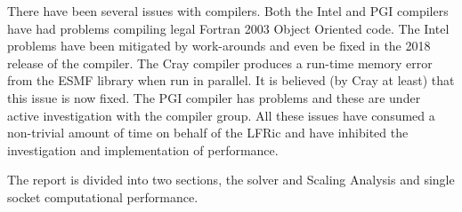 \documentclass[11pt]{article}
\begin{document}
There have been several issues with compilers. Both the Intel and PGI
compilers have had problems compiling legal Fortran 2003 Object
Oriented code. The Intel problems have been mitigated by work-arounds
and even be fixed in the 2018 release of the compiler. The Cray
compiler produces a run-time memory error from the ESMF library when
run in parallel. It is believed (by Cray at least) that this issue is
now fixed. The PGI compiler has problems and these are under active
investigation with the compiler group. All these issues have consumed
a non-trivial amount of time on behalf of the LFRic and have inhibited
the investigation and implementation of performance.

The report is divided into two sections, the solver and Scaling
Analysis and single socket computational performance.




\end{document}
